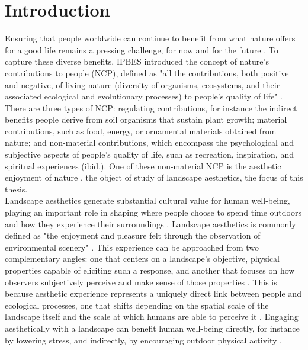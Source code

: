 \documentclass[hidelinks, 11pt]{article}
\begin{document}



\tableofcontents
\newpage                

\setcounter{page}{1}
\section{Introduction}\label{sec:Einleitung}
Ensuring that people worldwide can continue to benefit from what nature offers for a good life remains a pressing challenge, for now and for the future \citep{Diaz2015,Diaz2018}. To capture these diverse benefits, IPBES introduced the concept of nature's contributions to people (NCP), defined as "all the contributions, both positive and negative, of living nature (diversity of organisms, ecosystems, and their associated ecological and evolutionary processes) to people's quality of life" \citep{Diaz2018}. There are three types of NCP: regulating contributions, for instance the indirect benefits people derive from soil organisms that sustain plant growth; material contributions, such as food, energy, or ornamental materials obtained from nature; and non-material contributions, which encompass the psychological and subjective aspects of people's quality of life, such as recreation, inspiration, and spiritual experiences (ibid.). One of these non-material NCP is the aesthetic enjoyment of nature \citep{Bruley2021}, the object of study of landscape aesthetics, the focus of this thesis.
\\
Landscape aesthetics generate substantial cultural value for human well-being, playing an important role in shaping where people choose to spend time outdoors and how they experience their surroundings \citep{havinga_social_2021}. Landscape aesthetics is commonly defined as "the enjoyment and pleasure felt through the observation of environmental scenery" \citep{tribot_integrating_2018}. This experience can be approached from two complementary angles: one that centers on a landscape's objective, physical properties capable of eliciting such a response, and another that focuses on how observers subjectively perceive and make sense of those properties \citep{tribot_integrating_2018}. This is because aesthetic experience represents a uniquely direct link between people and ecological processes, one that shifts depending on the spatial scale of the landscape itself and the scale at which humans are able to perceive it \citep{tribot_integrating_2018,gobster_shared_2007}. Engaging aesthetically with a landscape can benefit human well-being directly, for instance by lowering stress, and indirectly, by encouraging outdoor physical activity \citep{gobster_shared_2007}.
\end{document}
